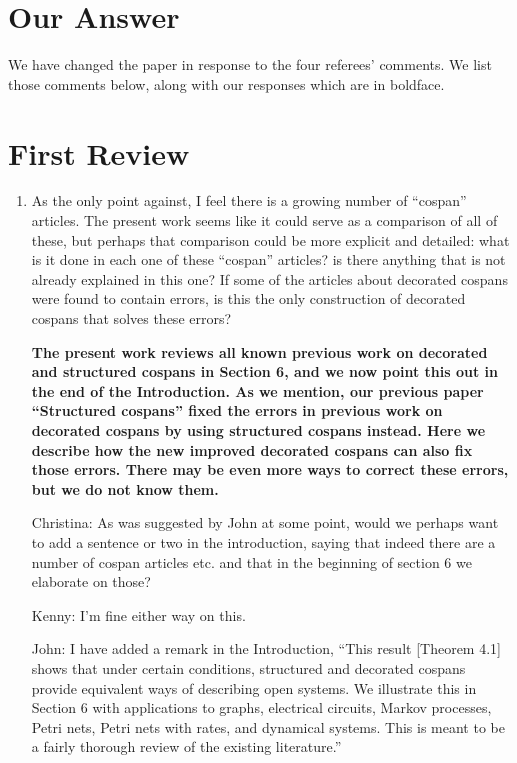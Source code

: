 \documentclass[reqno]{amsart}
\def\chris{\color{purple} Christina: }
\def\john{\color{red} John: }
\def\kenny{\color{blue} Kenny: }
\begin{document}
\section{Our Answer}
\fi

We have changed the paper in response to the four referees' comments.  We list those comments below, along with our responses which are in boldface.

\section*{First Review}

\begin{enumerate}

\item As the only point against, I feel there is a growing number of “cospan” articles. The present work seems like it could serve as a 
comparison of 
all of 
these, but perhaps that comparison could be more explicit and detailed: what is it done in each one of these “cospan” articles? is there anything 
that 
is not already explained in this one? If some of the articles about decorated cospans were found to contain errors, is this the only construction of 
decorated cospans that solves these errors?

{\bf The present work reviews all known previous work on decorated and structured cospans in Section 6, and we now point this out in the end of 
the Introduction.   As we mention, our previous paper ``Structured 
cospans'' fixed the errors in previous work on decorated cospans by using structured cospans instead.   Here we describe how the new improved 
decorated cospans can also fix those errors.     There may be even more ways to correct these errors, but we do not know them.}  

   

\iffalse
{\chris As was suggested by John at some point, would we perhaps want to add a sentence or two in the introduction, saying that indeed there are a 
number of cospan articles etc. and that in the beginning of section 6 we elaborate on those?}

{\kenny I'm fine either way on this.}

{\john I have added a remark in the Introduction, ``This result [Theorem 4.1] shows that under certain conditions, structured and decorated cospans 
provide equivalent ways of describing open systems.  We illustrate this in Section 6 with applications to graphs, electrical circuits, Markov 
processes, Petri nets, Petri nets with rates, and dynamical systems.   This is meant to be a fairly thorough review of the existing literature.'' 

}
\end{enumerate}
\end{document}
